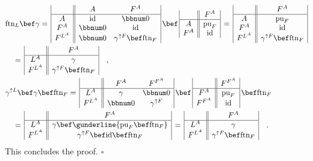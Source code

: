 \begin{align*}
 & \text{ftn}_{L}\bef\gamma=\,\begin{array}{|c||cc|}
 & A & F^{A}\\
\hline A & \text{id} & \bbnum 0\\
F^{A} & \bbnum 0 & \text{id}\\
F^{L^{A}} & \bbnum 0 & \gamma^{\uparrow F}\bef\text{ftn}_{F}
\end{array}\,\bef\,\begin{array}{|c||c|}
 & F^{A}\\
\hline A & \text{pu}_{F}\\
F^{A} & \text{id}
\end{array}\,=\,\begin{array}{|c||c|}
 & F^{A}\\
\hline A & \text{pu}_{F}\\
F^{A} & \text{id}\\
F^{L^{A}} & \gamma^{\uparrow F}\bef\text{ftn}_{F}
\end{array}\\
 & \quad=\,\begin{array}{|c||c|}
 & F^{A}\\
\hline L^{A} & \gamma\\
F^{L^{A}} & \gamma^{\uparrow F}\bef\text{ftn}_{F}
\end{array}\quad,\\
 & \gamma^{\uparrow L}\bef\gamma\bef\text{ftn}_{F}=\,\begin{array}{|c||cc|}
 & F^{A} & F^{F^{A}}\\
\hline L^{A} & \gamma & \bbnum 0\\
F^{L^{A}} & \bbnum 0 & \gamma^{\uparrow F}
\end{array}\,\bef\,\begin{array}{|c||c|}
 & F^{F^{A}}\\
\hline F^{A} & \text{pu}_{F}\\
F^{F^{A}} & \text{id}
\end{array}\,\bef\text{ftn}_{F}\\
 & \quad=\,\begin{array}{|c||c|}
 & F^{A}\\
\hline L^{A} & \gamma\bef\gunderline{\text{pu}_{F}\bef\text{ftn}_{F}}\\
F^{L^{A}} & \gamma^{\uparrow F}\bef\text{id}\bef\text{ftn}_{F}
\end{array}\,=\,\begin{array}{|c||c|}
 & F^{A}\\
\hline L^{A} & \gamma\\
F^{L^{A}} & \gamma^{\uparrow F}\bef\text{ftn}_{F}
\end{array}\quad.
\end{align*}
This concludes the proof. $\square$

